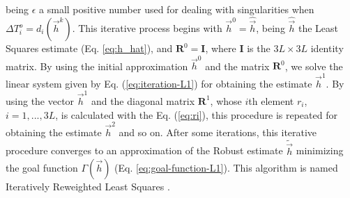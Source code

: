 \documentclass[journal abbreviation, npg]{copernicus}
\begin{document}
being $\epsilon$ a small positive number used for dealing with singularities when $\Delta T^{o}_{i} = d_{i}(\vec{h}^{k})$. This iterative process begins with $\vec{h}^{0} = \hat{\vec{h}}$, being $\hat{\vec{h}}$ the Least Squares estimate (Eq. \ref{eq:h_hat}), and $\mathbf{R}^{0} = \mathbf{I}$, where $\mathbf{I}$ is the $3L \times 3L$ identity matrix. By using the initial approximation $\vec{h}^{0}$ and the matrix $\mathbf{R}^{0}$, we solve the linear system given by Eq. (\ref{eq:iteration-L1}) for obtaining the estimate $\vec{h}^{1}$. By using the vector $\vec{h}^{1}$ and the diagonal matrix $\mathbf{R}^{1}$, whose $i$th element $r_{i}$, $i = 1, ..., 3L$, is calculated with the Eq. (\ref{eq:ri}), this procedure is repeated for obtaining the estimate $\vec{h}^{2}$ and so on. After some iterations, this iterative procedure converges to an approximation of the Robust estimate $\tilde{\vec{h}}$ minimizing the goal function $\Gamma(\vec{h})$ (Eq. \ref{eq:goal-function-L1}). This algorithm is named Iteratively Reweighted Least Squares \citep{scales_1988, aster-etal2005}.
\end{document}
